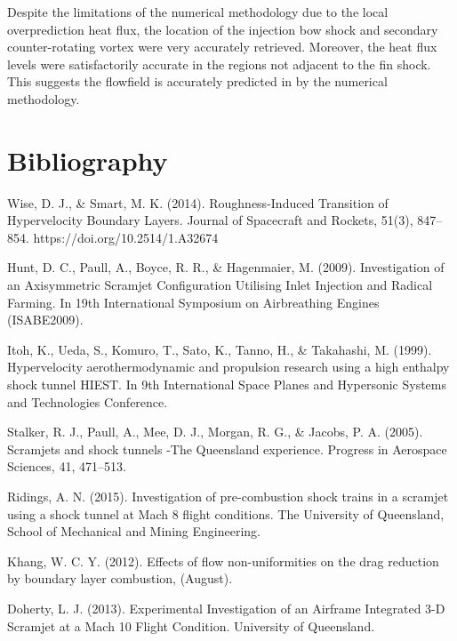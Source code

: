 \documentclass{AIAA}
\begin{document}
Despite the limitations of the numerical methodology due to the local overprediction heat flux, the location of the injection bow shock and secondary counter-rotating vortex were very accurately retrieved. Moreover, the heat flux levels were satisfactorily accurate in the regions not adjacent to the fin shock. This suggests the flowfield is accurately predicted in by the numerical methodology.


\section{Bibliography}

\begin{thebibliography}{}


Wise, D. J., \& Smart, M. K. (2014). Roughness-Induced Transition of Hypervelocity Boundary Layers. Journal of Spacecraft and Rockets, 51(3), 847–854. https://doi.org/10.2514/1.A32674


Hunt, D. C., Paull, A., Boyce, R. R., \& Hagenmaier, M. (2009). Investigation of an Axisymmetric Scramjet Configuration Utilising Inlet Injection and Radical Farming. In 19th International Symposium on Airbreathing Engines (ISABE2009).


Itoh, K., Ueda, S., Komuro, T., Sato, K., Tanno, H., \& Takahashi, M. (1999). Hypervelocity aerothermodynamic and propulsion research using a high enthalpy shock tunnel HIEST. In 9th International Space Planes and Hypersonic Systems and Technologies Conference.


Stalker, R. J., Paull, A., Mee, D. J., Morgan, R. G., \& Jacobs, P. A. (2005). Scramjets and shock tunnels -The Queensland experience. Progress in Aerospace Sciences, 41, 471–513.


Ridings, A. N. (2015). Investigation of pre-combustion shock trains in a scramjet using a shock tunnel at Mach 8 flight conditions. The University of Queensland, School of Mechanical and Mining Engineering.


Khang, W. C. Y. (2012). Effects of flow non-uniformities on the drag reduction by boundary layer combustion, (August).


Doherty, L. J. (2013). Experimental Investigation of an Airframe Integrated 3-D Scramjet at a Mach 10 Flight Condition. University of Queensland.



\end{thebibliography}
\end{document}

